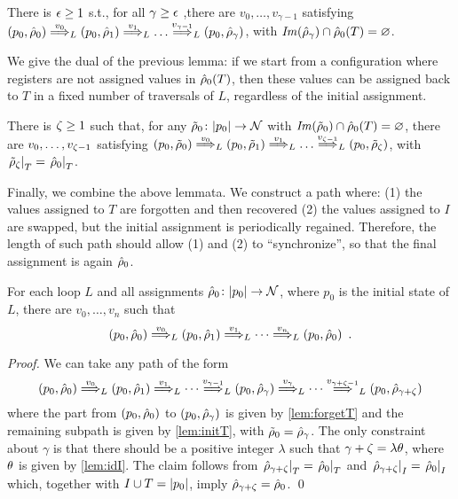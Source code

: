 %
\begin{lemma}
There is $\epsilon \geq 1$ s.t., for all $\gamma \geq \epsilon$ ,there are $v_0,\dots,v_{\gamma-1}$ satisfying $(p_0,\hat{\rho}_0) \overset{v_0}{\Longrightarrow}_{L} (p_0,\hat{\rho}_1) \overset{v_1}{\Longrightarrow}_{L} \dots \overset{v_{\gamma-1}}{\Longrightarrow}_{L} (p_0,\hat{\rho}_\gamma)$, with $\mathit{Im}(\hat{\rho}_\gamma) \cap \hat{\rho}_0(T) = \varnothing$.
\label{lem:forgetT}
\end{lemma}
%
%
We give the dual of the previous lemma: if we start from a configuration where registers are not assigned values in $\hat{\rho}_0(T)$, then these values can be assigned back to $T$ in a fixed number of traversals of $L$, regardless of the initial assignment.

\begin{lemma}
There is $\zeta \geq 1$ such that,
for any $\tilde{\rho}_0 \colon |p_0| \to \mathcal{N}$ with $\mathit{Im}(\tilde{\rho}_0) \cap \hat{\rho}_0(T) = \varnothing$, there are $v_0,\dots,v_{\zeta-1}$ satisfying $ (p_0,\tilde{\rho}_0) \overset{v_0}{\Longrightarrow}_{L} (p_0,\tilde{\rho}_1) \overset{v_1}{\Longrightarrow}_{L} \dots \overset{v_{\zeta-1}}{\Longrightarrow}_{L} (p_0,\tilde{\rho}_\zeta)$, with $\left.\tilde{\rho}_\zeta\right|_{T} = \left.\hat{\rho}_0\right|_{T}$.
\label{lem:initT}
\end{lemma}
%
%
Finally, we combine the above lemmata. We construct a path where: (1) the values assigned to $T$ are forgotten and then recovered (2) the values assigned to $I$ are swapped, but the initial assignment is periodically regained. Therefore, the length of such path should allow (1) and (2) to ``synchronize'', so that the final assignment is again $\hat{\rho}_0$.

\begin{theorem}
\label{thm:loop}
%
%
For each loop $L$ and all assignments $\hat{\rho}_0 \colon |p_0| \to \mathcal{N}$, where $p_0$ is the initial state of $L$, there are $v_0,\dots,v_n$ such that
\[
	(p_0, \hat{\rho}_0) \overset{v_0}{\Longrightarrow}_{L} (p_0, \hat{\rho}_1) \overset{v_1}{\Longrightarrow}_{L} \cdots \overset{v_n}{\Longrightarrow}_{L} (p_0,\hat{\rho}_0) \enspace .
\]
\end{theorem}

\begin{proof}
We can take any path of the form
\[
	(p_0,\hat{\rho}_0) \overset{v_0}{\Longrightarrow}_{L} (p_0,\hat{\rho}_1) \overset{v_1}{\Longrightarrow}_{L} \cdots \overset{v_{\gamma-1}}{\Longrightarrow}_{L} (p_0,\hat{\rho}_\gamma) \overset{v_{\gamma}}{\Longrightarrow}_{L} \cdots \overset{v_{\gamma + \zeta - 1}}{\Longrightarrow}_{L} (p_0,\hat{\rho}_{\gamma + 
	 \zeta})
\]
where the part from $(p_0,\hat{\rho}_0)$ to $(p_0,\hat{\rho}_\gamma)$ is given by \cref{lem:forgetT} and the remaining subpath is given by \cref{lem:initT}, with $\tilde{\rho}_0 = \hat{\rho}_\gamma$. The only constraint about $\gamma$ is that there should be a positive integer $\lambda$ such that $\gamma + \zeta = \lambda \theta$, where $\theta$ is given by \cref{lem:idI}. The claim follows from $\left.\hat{\rho}_{\gamma + \zeta}\right|_{T} = \left.\hat{\rho}_0\right|_{T}$ and 
$\left.\hat{\rho}_{\gamma + \zeta}\right|_{I} = \left.\hat{\rho}_0\right|_{I}$ which, together with $I \cup T = |p_0|$, imply $\hat{\rho}_{\gamma + \zeta} = \hat{\rho}_0$.
\qed
\end{proof}
%

